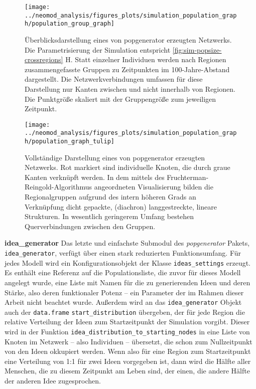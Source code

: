 \documentclass[openany,twoside,twocolumn]{book}
\begin{document}
\begin{landscape}
\begin{figure}[!t]

{\centering \texttt{[image: ../neomod\_analysis/figures\_plots/simulation\_population\_graph/population\_group\_graph]} 

}

\caption[Überblicksdarstellung eines von popgenerator erzeugten Netzwerks]{Überblicksdarstellung eines von popgenerator erzeugten Netzwerks. Die Parametrisierung der Simulation entspricht \ref{fig:sim-popsize-crossregions} H. Statt einzelner Individuen werden nach Regionen zusammengefasste Gruppen zu Zeitpunkten im 100-Jahre-Abstand dargestellt. Die Netzwerkverbindungen umfassen für diese Darstellung nur Kanten zwischen und nicht innerhalb von Regionen. Die Punktgröße skaliert mit der Gruppengröße zum jeweiligen Zeitpunkt.}\label{fig:group-graph}
\end{figure}
\end{landscape}

\begin{figure}[!t]

{\centering \texttt{[image: ../neomod\_analysis/figures\_plots/simulation\_population\_graph/population\_graph\_tulip]} 

}

\caption[Vollständige Darstellung eines von popgenerator erzeugten Netzwerks]{Vollständige Darstellung eines von popgenerator erzeugten Netzwerks. Rot markiert sind individuelle Knoten, die durch graue Kanten verknüpft werden. In dem mittels des Fruchterman-Reingold-Algorithmus angeordneten Visualisierung bilden die Regionalgruppen aufgrund des intern höheren Grads an Verknüpfung dicht gepackte, (diachron) langgestreckte, lineare Strukturen. In wesentlich geringerem Umfang bestehen Querverbindungen zwischen den Gruppen.}\label{fig:graph-tulip}
\end{figure}

\textbf{idea\_generator} \newline  Das letzte und einfachste Submodul
des \emph{popgenerator} Pakets, \texttt{idea\_generator}, verfügt über
einen stark reduzierten Funktionsumfang. Für jedes Modell wird ein
Konfigurationsobjekt der Klasse \texttt{ideas\_settings} erzeugt. Es
enthält eine Referenz auf die Populationsliste, die zuvor für dieses
Modell angelegt wurde, eine Liste mit Namen für die zu generierenden
Ideen und deren Stärke, also deren funktionaler Potenz -- ein Parameter
der im Rahmen dieser Arbeit nicht beachtet wurde. Außerdem wird an das
\texttt{idea\_generator} Objekt auch der \texttt{data.frame}
\texttt{start\_distribution} übergeben, der für jede Region die relative
Verteilung der Ideen zum Startzeitpunkt der Simulation vorgibt. Dieser
wird in der Funktion \texttt{idea\_distribution\_to\_starting\_nodes} in
eine Liste von Knoten im Netzwerk -- also Individuen -- übersetzt, die
schon zum Nullzeitpunkt von den Ideen okkupiert werden. Wenn also für
eine Region zum Startzeitpunkt eine Verteilung von 1:1 für zwei Ideen
vorgegeben ist, dann wird die Hälfte aller Menschen, die zu diesem
Zeitpunkt am Leben sind, der einen, die andere Hälfte der anderen Idee
zugesprochen.
\end{document}
